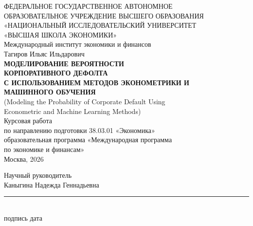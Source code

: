 \documentclass[12pt,a4paper]{article}
\begin{document}
\begin{titlepage}
\begin{center}
\onehalfspacing
{\small\textrussian{%
ФЕДЕРАЛЬНОЕ ГОСУДАРСТВЕННОЕ АВТОНОМНОЕ\\
ОБРАЗОВАТЕЛЬНОЕ УЧРЕЖДЕНИЕ ВЫСШЕГО ОБРАЗОВАНИЯ\\
«НАЦИОНАЛЬНЫЙ ИССЛЕДОВАТЕЛЬСКИЙ УНИВЕРСИТЕТ\\
«ВЫСШАЯ ШКОЛА ЭКОНОМИКИ»\\[10pt]
Международный институт экономики и финансов}\\
}
\vfill
{\large\textrussian{Тагиров Ильяс Ильдарович}}\\[26pt]
{\Large\bfseries\textrussian{МОДЕЛИРОВАНИЕ ВЕРОЯТНОСТИ\\[4pt]
КОРПОРАТИВНОГО ДЕФОЛТА\\[4pt]
С ИСПОЛЬЗОВАНИЕМ МЕТОДОВ ЭКОНОМЕТРИКИ И\\[4pt]
МАШИННОГО ОБУЧЕНИЯ}}\\[14pt]
{\large (Modeling the Probability of Corporate Default Using\\
Econometric and Machine Learning Methods)}\\[34pt]
{\normalsize\textrussian{%
Курсовая работа\\[6pt]
по направлению подготовки 38.03.01 «Экономика»\\
образовательная программа «Международная программа\\
по экономике и финансам»}\\
}
\vfill
{\normalsize\textrussian{Москва, 2026}}\\[18pt]
\end{center}
\begin{flushright}
{\normalsize\textrussian{%
Научный руководитель\\
Каныгина Надежда Геннадьевна}\\[20pt]
\rule{60mm}{0.4pt}\\
\hspace{6mm}подпись \hspace{26mm} дата
}
\end{flushright}
\end{titlepage}
\end{document}
